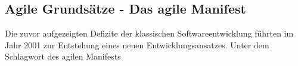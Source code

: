 \subsection{Agile Grundsätze - Das agile Manifest}
\label{Agile Grundsätze - Das agile Manifest}
Die zuvor aufgezeigten Defizite der klassischen Softwareentwicklung führten im Jahr 2001 zur Entstehung eines neuen Entwicklungsansatzes. Unter dem Schlagwort des agilen Manifests 
